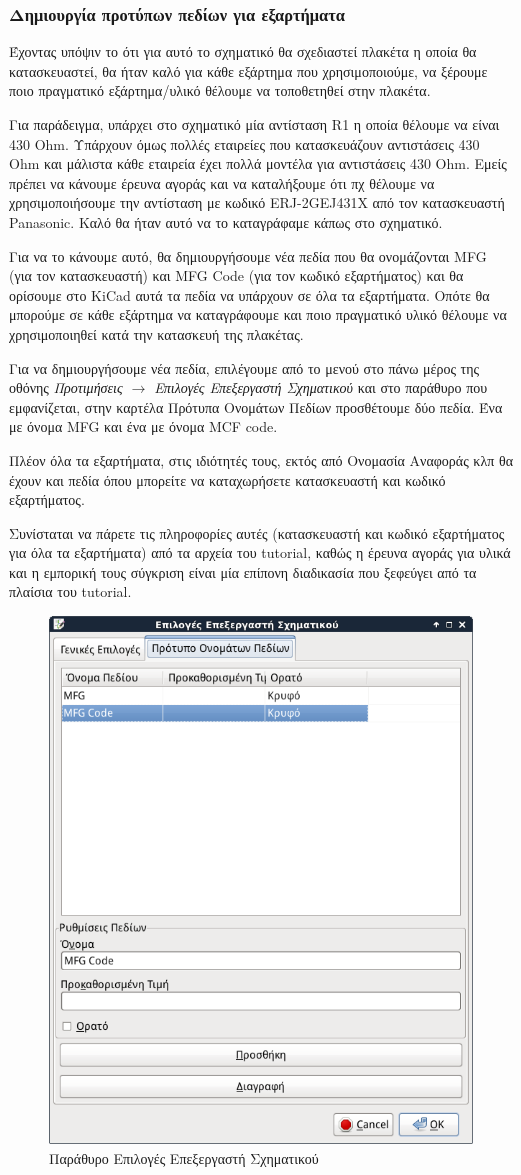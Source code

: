 \documentclass[a4paper]{article}
\begin{document}
\subsubsection{Δημιουργία προτύπων πεδίων για εξαρτήματα}
Έχοντας υπόψιν το ότι για αυτό το σχηματικό θα σχεδιαστεί πλακέτα η οποία θα κατασκευαστεί, θα ήταν καλό για κάθε εξάρτημα που χρησιμοποιούμε, να ξέρουμε ποιο πραγματικό εξάρτημα/υλικό θέλουμε να τοποθετηθεί στην πλακέτα. 

Για παράδειγμα, υπάρχει στο σχηματικό μία αντίσταση R1 η οποία θέλουμε να είναι 430 Ohm. Υπάρχουν όμως πολλές εταιρείες που κατασκευάζουν αντιστάσεις 430 Ohm και μάλιστα κάθε εταιρεία έχει πολλά μοντέλα για αντιστάσεις 430 Ohm. Εμείς πρέπει να κάνουμε έρευνα αγοράς και να καταλήξουμε ότι πχ θέλουμε να χρησιμοποιήσουμε την αντίσταση με κωδικό ERJ-2GEJ431X από τον κατασκευαστή Panasonic. Καλό θα ήταν αυτό να το καταγράφαμε κάπως στο σχηματικό. 

Για να το κάνουμε αυτό, θα δημιουργήσουμε νέα πεδία που θα ονομάζονται MFG (για τον κατασκευαστή) και MFG Code (για τον κωδικό εξαρτήματος) και θα ορίσουμε στο KiCad αυτά τα πεδία να υπάρχουν σε όλα τα εξαρτήματα. Οπότε θα μπορούμε σε κάθε εξάρτημα να καταγράφουμε και ποιο πραγματικό υλικό θέλουμε να χρησιμοποιηθεί κατά την κατασκευή της πλακέτας.

Για να δημιουργήσουμε νέα πεδία, επιλέγουμε από το μενού στο πάνω μέρος της οθόνης \textit{Προτιμήσεις $\rightarrow$ Επιλογές Επεξεργαστή Σχηματικού} και στο παράθυρο που εμφανίζεται, στην καρτέλα Πρότυπα Ονομάτων Πεδίων προσθέτουμε δύο πεδία. Ένα με όνομα MFG και ένα με όνομα MCF code.

Πλέον όλα τα εξαρτήματα, στις ιδιότητές τους, εκτός από Ονομασία Αναφοράς κλπ θα έχουν και πεδία όπου μπορείτε να καταχωρήσετε κατασκευαστή και κωδικό εξαρτήματος. 

Συνίσταται να πάρετε τις πληροφορίες αυτές (κατασκευαστή και κωδικό εξαρτήματος για όλα τα εξαρτήματα) από τα αρχεία του tutorial, καθώς η έρευνα αγοράς για υλικά και η εμπορική τους σύγκριση είναι μία επίπονη διαδικασία που ξεφεύγει από τα πλαίσια του tutorial. 

\begin{figure}
  \begin{center}
    \includegraphics[width=.35\textwidth]{img/eesch-dial-templ.png}
    \caption{Παράθυρο Επιλογές Επεξεργαστή Σχηματικού}
    \label{fig:eesch-dial-templ}
  \end{center}
\end{figure}
\end{document}
